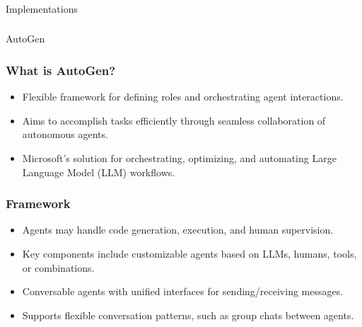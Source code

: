 \begin{frame}[fragile]\frametitle{}
\begin{center}
{\Large Implementations}
\end{center}
\end{frame}

\begin{frame}[fragile]\frametitle{}
\begin{center}
{\Large AutoGen}
\end{center}
\end{frame}

\begin{frame}[fragile]\frametitle{What is AutoGen?}
  \begin{itemize}
    \item Flexible framework for defining roles and orchestrating agent interactions.
    \item Aims to accomplish tasks efficiently through seamless collaboration of autonomous agents.
    \item Microsoft's solution for orchestrating, optimizing, and automating Large Language Model (LLM) workflows.
  \end{itemize}
\end{frame}


\begin{frame}[fragile]\frametitle{Framework}
  \begin{itemize}
    \item Agents may handle code generation, execution, and human supervision.
    \item Key components include customizable agents based on LLMs, humans, tools, or combinations.
    \item Conversable agents with unified interfaces for sending/receiving messages.
    \item Supports flexible conversation patterns, such as group chats between agents.
  \end{itemize}
\end{frame}

